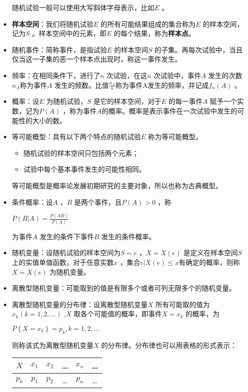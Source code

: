 \documentclass[11pt]{book}
\newcounter{#2}
\newcounter{#2}[#1]
\numberwithin{#2}{#1}
\begin{document}
\begin{itemize}
	随机试验一般可以使用大写斜体字母表示，比如$ E $ 。
		\item \textbf{样本空间}：我们将随机试验$ E $ 的所有可能结果组成的集合称为$ E $ 的样本空间，记为$ S $  。样本空间中的元素，即$ E $ 的每个结果，称为\textbf{样本点}。
		\item 随机事件：简称事件，是指试验$ E$ 的样本空间$ S$ 的子集。再每次试验中，当且仅当这一子集的恶一个样本点出现时，称这一事件发生。
		\item 频率：在相同条件下，进行了$ n $ 次试验，在这$ n $ 次试验中，事件$ A $ 发生的次数$ n_A $称为事件$ A $ 发生的频数。比值$ \frac{n_A}{n} $称为事件A发生的频率，并记成$ f_n (A) $ 。
		\item 概率：设$ E $ 为随机试验，$ S $ 是它的样本空间，对于$ E $ 的每一事件$ A $ 赋予一个实数，记为$ P(A) $ ，称为事件$ A $的概率。概率是表示事件在一次试验中发生的可能性的大小的数。
		\item 等可能概型：具有以下两个特点的随机试验$ E $ 称为等可能概型。
		\begin{itemize}
			\item 随机试验的样本空间只包括两个元素；
			\item 试验中每个基本事件发生的可能性相同。
		\end{itemize}
		等可能概型是概率论发展初期研究的主要对象，所以也称为古典概型。
		\item 条件概率：设$ A $ ，$ B $ 是两个事件，且$ P(A)>0 $ ，称
		\begin{center}
			$ P(B|A)=\frac{P(AB)}{P(A)} $
		\end{center}
		为事件$ A $ 发生的条件下事件$ B $ 发生的条件概率。
		\item 随机变量：设随机试验的样本空间为$ S={e}$ ，$ X=X(e)$ 是定义在样本空间$ S $上的实值单值函数，对于任意实数$ x$ ，集合$ {e|X(e)\le x}$有确定的概率，则称$ X=X(e)$ 为随机变量。
		\item 离散型随机变量：可能取到的值是有限多个或者可列无限多个的随机变量。
		\item 离散型随机变量的分布律：设离散型随机变量$ X $ 所有可能取的值为$ x_k(k=1, 2, \dots)$ ,$ X $ 取各个可能值的概率，即事件$ {X=x_k} $ 的概率，为
		\begin{center}
			$ P\left\{X=x_k\right\}=p_k, k=1, 2, \dots $
		\end{center}
		则称该式为离散型随机变量$ X $ 的分布律。分布律也可以用表格的形式表示：
		\begin{center}
			\begin{tabular}{|c|c|c|c|c|c|}
				\hline
				$ X $ & $ x_1 $ & $ x_2 $ & \dots & $ x_n $ & \dots \\
				\hline 
				$ p_k $ & $ p_1 $ & $ p_2 $ & \dots & $ p_n $ & \dots \\
				\hline
			\end{tabular}
		\end{center}
	\end{itemize}
\end{document}
